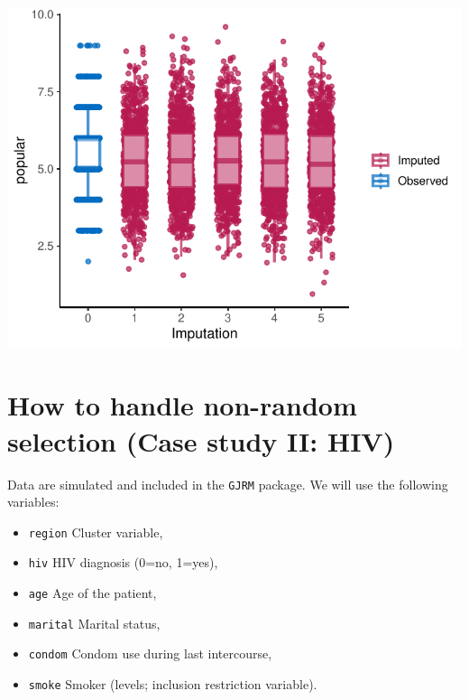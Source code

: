 \documentclass[
]{jss}
\providecommand{\tightlist}{%
  \setlength{\itemsep}{0pt}\setlength{\parskip}{0pt}}
\begin{document}
\begin{CodeChunk}


\begin{center}\includegraphics{Imputation_of_Incomplete_Multilevel_Data_files/figure-latex/pop_pan_eval-1} \end{center}

\end{CodeChunk}

\hypertarget{how-to-handle-non-random-selection-case-study-ii-hiv}{%
\section{How to handle non-random selection (Case study II:
HIV)}\label{how-to-handle-non-random-selection-case-study-ii-hiv}}

Data are simulated and included in the \texttt{GJRM} package. We will
use the following variables:

\begin{itemize}
\tightlist
\item
  \texttt{region} Cluster variable,
\item
  \texttt{hiv} HIV diagnosis (0=no, 1=yes),
\item
  \texttt{age} Age of the patient,
\item
  \texttt{marital} Marital status,
\item
  \texttt{condom} Condom use during last intercourse,
\item
  \texttt{smoke} Smoker (levels; inclusion restriction variable).
\end{itemize}
\end{document}
